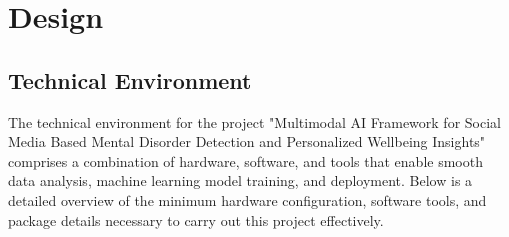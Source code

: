 
\section{Design}

\subsection{Technical Environment}
\noindent
The technical environment for the project "Multimodal AI Framework for Social Media Based Mental Disorder Detection and Personalized Wellbeing Insights" comprises a combination of hardware, software, and tools that enable smooth data analysis, machine learning model training, and deployment. Below is a detailed overview of the minimum hardware configuration, software tools, and package details necessary to carry out this project effectively. \\

